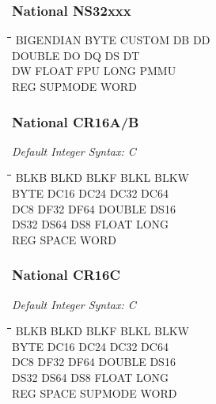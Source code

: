 \subsubsection{National NS32xxx}
{\tt\begin{tabbing}
\hspace{3cm}\=\hspace{3cm}\=\hspace{3cm}\=\hspace{3cm}\=\kill
BIGENDIAN  \> BYTE        \> CUSTOM     \> DB           \> DD \\
DOUBLE     \> DO          \> DQ         \> DS           \> DT \\
DW         \> FLOAT       \> FPU        \> LONG         \> PMMU \\
REG        \> SUPMODE     \> WORD \\
\end{tabbing}}

\subsubsection{National CR16A/B}

{\em Default Integer Syntax: C}

{\tt\begin{tabbing}
\hspace{3cm}\=\hspace{3cm}\=\hspace{3cm}\=\hspace{3cm}\=\kill
BLKB       \> BLKD        \> BLKF       \> BLKL         \> BLKW \\
BYTE       \> DC16        \> DC24       \> DC32         \> DC64 \\
DC8        \> DF32        \> DF64       \> DOUBLE       \> DS16 \\
DS32       \> DS64        \> DS8        \> FLOAT        \> LONG \\
REG        \> SPACE       \> WORD \\
\end{tabbing}}

\subsubsection{National CR16C}

{\em Default Integer Syntax: C}

{\tt\begin{tabbing}
\hspace{3cm}\=\hspace{3cm}\=\hspace{3cm}\=\hspace{3cm}\=\kill
BLKB       \> BLKD        \> BLKF       \> BLKL         \> BLKW \\
BYTE       \> DC16        \> DC24       \> DC32         \> DC64 \\
DC8        \> DF32        \> DF64       \> DOUBLE       \> DS16 \\
DS32       \> DS64        \> DS8        \> FLOAT        \> LONG \\
REG        \> SPACE       \> SUPMODE    \> WORD \\
\end{tabbing}}

